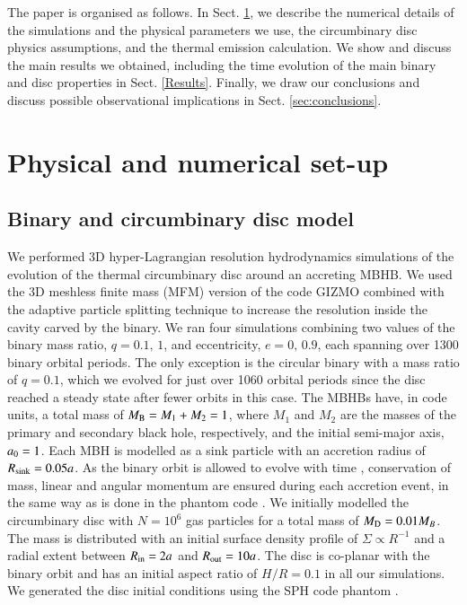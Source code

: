\documentclass{aa}
\begin{document}
The paper is organised as follows. In Sect. \ref{NumericalPhysicalSetup}, we describe the numerical details of the simulations and the physical parameters we use, the circumbinary disc physics assumptions, and the thermal emission calculation. We show and discuss the main results we obtained, including the time evolution of the main binary and disc properties in Sect. \ref{Results}. Finally, we draw our conclusions and discuss possible observational implications in Sect. \ref{sec:conclusions}.

\section{Physical and numerical set-up}
\label{NumericalPhysicalSetup}

\subsection{Binary and circumbinary disc model}
\label{discmodel}

We performed 3D hyper-Lagrangian resolution hydrodynamics simulations of the evolution of the thermal circumbinary disc around an accreting MBHB. We used the 3D meshless finite mass (MFM) version of the code \textsc{GIZMO} \citep{Hopkins2015} combined with the adaptive particle splitting technique \citep[see][for details]{Franchini2022} to increase the resolution inside the cavity carved by the binary. 
We ran four simulations combining two values of the binary mass ratio, $q = 0.1,\,1$, and eccentricity, $e=0,\,0.9$, each spanning over 1300 binary orbital periods.
The only exception is the circular binary with a mass ratio of $q=0.1$, which we evolved for just over 1060 orbital periods since the disc reached a steady state after fewer orbits in this case.
The MBHBs have, in code units, a total mass of $M_{\rm B} = M_{\rm 1} + M_{\rm 2} = 1$, where $M_{1}$ and $M_{2}$ are the masses of the primary and secondary black hole, respectively, and the initial semi-major axis, $a_{\rm 0}=1$. Each MBH is modelled as a sink particle with an accretion radius of $R_{\rm sink} = 0.05a$. As the binary orbit is allowed to evolve with time \citep{Franchini2023}, conservation of mass, linear and angular momentum are ensured during each accretion event, in the same way as is done in the {\sc phantom} code \citep{bate1995}.
We initially modelled the circumbinary disc with $N=10^6$ gas particles for a total mass of $M_{\rm D} = 0.01 M_{B}$. The mass is distributed with an initial surface density profile of $\Sigma \propto R^{-1}$ and a radial extent between $R_{\rm in}=2a$ and $R_{\rm out}=10a$. The disc is co-planar with the binary orbit and has an initial aspect ratio of $H/R = 0.1$ in all our simulations. We generated the disc initial conditions using the SPH code {\sc phantom} \citep{Price2017}.
\end{document}
